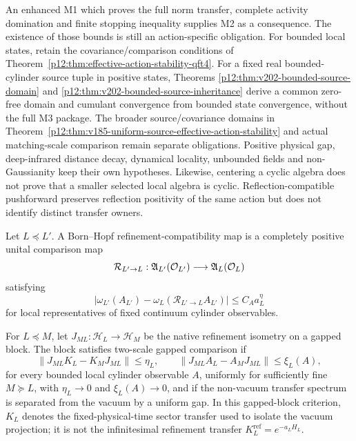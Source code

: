 \documentclass[12pt,a4paper]{article}
\begin{document}
\begin{remark}
\label{p12:rem:v198-premise-reduction-scope}
An enhanced M1 which proves the full norm transfer, complete activity
domination and finite stopping inequality supplies M2 as a consequence.
The existence of those bounds is still an action-specific obligation.
For bounded local states, retain the covariance/comparison conditions of
Theorem~\ref{p12:thm:effective-action-stability-qft4}. For a fixed real
bounded-cylinder source tuple in positive states, Theorems
\ref{p12:thm:v202-bounded-source-domain} and
\ref{p12:thm:v202-bounded-source-inheritance} derive a common zero-free
domain and cumulant convergence from bounded state convergence, without
the full M3 package. The broader source/covariance domains in
Theorem~\ref{p12:thm:v185-uniform-source-effective-action-stability}
and actual matching-scale comparison remain separate obligations.  Positive
physical gap, deep-infrared distance decay, dynamical locality, unbounded
fields and non-Gaussianity keep their own hypotheses.  Likewise, centering
a cyclic algebra does not prove that a smaller selected local algebra is
cyclic.  Reflection-compatible pushforward preserves reflection positivity
of the same action but does not identify distinct transfer owners.
\end{remark}

\begin{definition}
\label{p12:def:bh-renormalization-map}
Let \(L\preceq L'\).  A Born--Hopf refinement-compatibility map is a completely positive unital comparison map
\[
\mathcal R_{L'\to L}:\mathfrak A_{L'}(\mathcal O_{L'})\longrightarrow\mathfrak A_L(\mathcal O_L)
\]
satisfying
\begin{equation}
\label{p12:eq:renormalization-expectation-compatibility}
\left|
\omega_{L'}(A_{L'})-\omega_L(\mathcal R_{L'\to L}A_{L'})
\right|
\le C_A a_L^\eta
\end{equation}
for local representatives of fixed continuum cylinder observables.
\end{definition}


\begin{definition}
\label{p12:def:two-scale-gapped-comparison}
For \(L\preceq M\), let \(J_{ML}:\mathcal H_L\to\mathcal H_M\) be the native refinement isometry on a gapped block.  The block satisfies two-scale gapped comparison if
\[
\|J_{ML}K_L-K_MJ_{ML}\|\le\eta_L,
\qquad
\|J_{ML}A_L-A_MJ_{ML}\|\le\xi_L(A),
\]
for every bounded local cylinder observable \(A\), uniformly for sufficiently fine \(M\succeq L\), with \(\eta_L\to0\) and \(\xi_L(A)\to0\), and if the non-vacuum transfer spectrum is separated from the vacuum by a uniform gap.  In this gapped-block criterion, \(K_L\) denotes the fixed-physical-time sector transfer used to isolate the vacuum projection; it is not the infinitesimal refinement transfer \(K_L^{\mathrm{ref}}=e^{-a_LH_L}\).
\end{definition}
\end{document}
